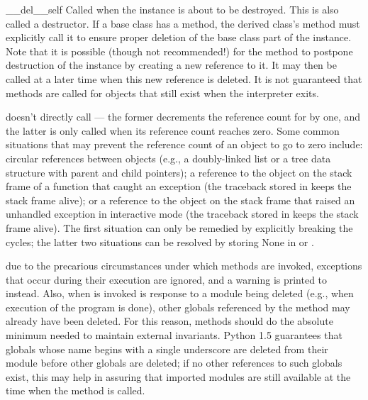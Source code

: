 \begin{methoddesc}[object]{__del__}{self}
Called when the instance is about to be destroyed.  This is also
called a destructor.  If a base class
has a  method, the derived class's  method
must explicitly call it to ensure proper deletion of the base class
part of the instance.  Note that it is possible (though not recommended!)
for the 
method to postpone destruction of the instance by creating a new
reference to it.  It may then be called at a later time when this new
reference is deleted.  It is not guaranteed that
 methods are called for objects that still exist when
the interpreter exits.

  doesn't directly call
 --- the former decrements the reference count for
 by one, and the latter is only called when its reference
count reaches zero.  Some common situations that may prevent the
reference count of an object to go to zero include: circular
references between objects (e.g., a doubly-linked list or a tree data
structure with parent and child pointers); a reference to the object
on the stack frame of a function that caught an exception (the
traceback stored in  keeps the stack frame
alive); or a reference to the object on the stack frame that raised an
unhandled exception in interactive mode (the traceback stored in
 keeps the stack frame alive).  The first
situation can only be remedied by explicitly breaking the cycles; the
latter two situations can be resolved by storing None in
 or .

 due to the precarious circumstances under which
 methods are invoked, exceptions that occur during their
execution are ignored, and a warning is printed to 
instead.  Also, when  is invoked is response to a module
being deleted (e.g., when execution of the program is done), other
globals referenced by the  method may already have been
deleted.  For this reason,  methods should do the
absolute minimum needed to maintain external invariants.  Python 1.5
guarantees that globals whose name begins with a single underscore are
deleted from their module before other globals are deleted; if no
other references to such globals exist, this may help in assuring that
imported modules are still available at the time when the
 method is called. 
\end{methoddesc}

